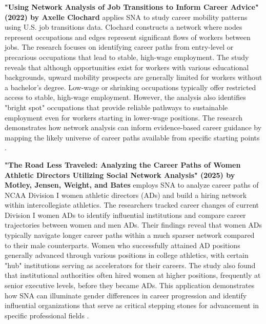 \documentclass[../main.tex]{subfiles}
\begin{document}
\textbf{"Using Network Analysis of Job Transitions to Inform Career Advice" (2022) by Axelle Clochard} applies SNA to study career mobility patterns using U.S. job transitions data. Clochard constructs a network where nodes represent occupations and edges represent significant flows of workers between jobs. The research focuses on identifying career paths from entry-level or precarious occupations that lead to stable, high-wage employment. The study reveals that although opportunities exist for workers with various educational backgrounds, upward mobility prospects are generally limited for workers without a bachelor's degree. Low-wage or shrinking occupations typically offer restricted access to stable, high-wage employment. However, the analysis also identifies "bright spot" occupations that provide reliable pathways to sustainable employment even for workers starting in lower-wage positions. The research demonstrates how network analysis can inform evidence-based career guidance by mapping the likely universe of career paths available from specific starting points \citep{clochard_network_2022}.

\textbf{"The Road Less Traveled: Analyzing the Career Paths of Women Athletic Directors Utilizing Social Network Analysis" (2025) by Motley, Jensen, Weight, and Bates} employs SNA to analyze career paths of NCAA Division I women athletic directors (ADs) and build a hiring network within intercollegiate athletics. The researchers tracked career changes of current Division I women ADs to identify influential institutions and compare career trajectories between women and men ADs. Their findings reveal that women ADs typically navigate longer career paths within a much sparser network compared to their male counterparts. Women who successfully attained AD positions generally advanced through various positions in college athletics, with certain "hub" institutions serving as accelerators for their careers. The study also found that institutional authorities often hired women at higher positions, frequently at senior executive levels, before they became ADs. This application demonstrates how SNA can illuminate gender differences in career progression and identify influential organizations that serve as critical stepping stones for advancement in specific professional fields \citep{motley_women_ad}.
\end{document}

